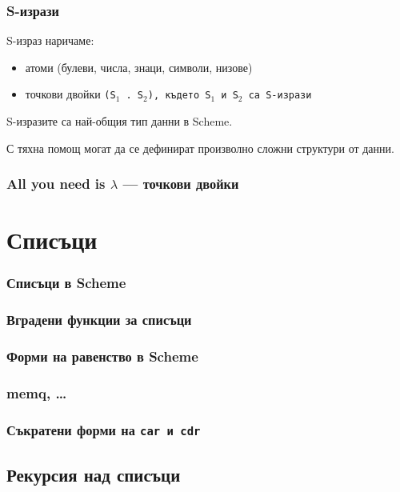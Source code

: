 \documentclass{beamer}
\begin{document}
\begin{frame}
  \frametitle{S-изрази}

  \begin{definition}
    S-израз наричаме:
    \begin{itemize}
    \item атоми (булеви, числа, знаци, символи, низове)
    \item точкови двойки \tt{(S$_1$ . S$_2$)}, където \tt{S$_1$} и \tt{S$_2$} са S-изрази
    \end{itemize}
  \end{definition}
  \vspace{1em}

  \pause

  \alert{S-изразите са най-общия тип данни в Scheme.}

  \vspace{1em}
  С тяхна помощ могат да се дефинират произволно сложни структури от данни.
\end{frame}

\begin{frame}
  \frametitle{All you need is $\lambda$ --- точкови двойки}
\end{frame}

\section{Списъци}

\begin{frame}
  \frametitle{Списъци в Scheme}
\end{frame}

\begin{frame}
  \frametitle{Вградени функции за списъци}
\end{frame}

\begin{frame}
  \frametitle{Форми на равенство в Scheme}
\end{frame}

\begin{frame}
  \frametitle{memq, \ldots}
\end{frame}

\begin{frame}
  \frametitle{Съкратени форми на \tt{car} и \tt{cdr}}
\end{frame}


\subsection{Рекурсия над списъци}
\end{document}
